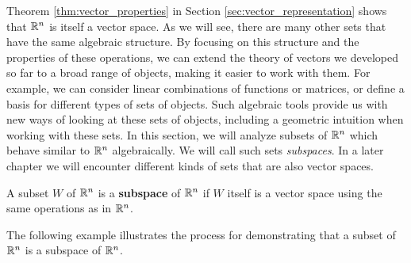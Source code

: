 Theorem \ref{thm:vector_properties} in Section \ref{sec:vector_representation} shows that $\mathbb{R}^n$ is itself a vector space. As we will see, there are many other sets that have the same algebraic structure. By focusing on this structure and the properties of these operations, we can extend the theory of vectors we developed so far to a broad range of objects, making it easier to work with them. For example, we can consider linear combinations of functions or matrices, or define a basis for different types of sets of objects. Such algebraic tools provide us with new ways of looking at these sets of objects, including a geometric intuition when working with these sets. In this section, we will analyze subsets of $\mathbb{R}^n$ which behave similar to $\mathbb{R}^n$ algebraically. We will call such sets \emph{subspaces}. In a later chapter we will encounter different kinds of sets that are also vector spaces. 

\begin{definition} \label{def:3_a_subspaces} A subset $W$ of $\mathbb{R}^n$ is a \textbf{subspace} of $\mathbb{R}^n$ if $W$ itself is a vector space using the same operations as in $\mathbb{R}^n$. 
\end{definition}

The following example illustrates the process for demonstrating that a subset of $\mathbb{R}^n$ is a subspace of $\mathbb{R}^n$.

